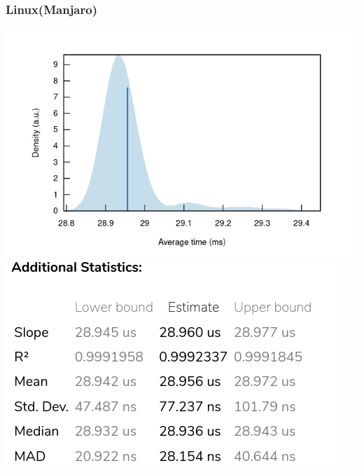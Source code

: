 \documentclass[12pt, a4paper]{report}
\begin{document}
   \subsubsection{Linux(Manjaro)}
   \includegraphics[width=1\textwidth]{bench_linux_average_time}
   \includegraphics[width=.8\textwidth]{add_stats_linux}
\end{document}

